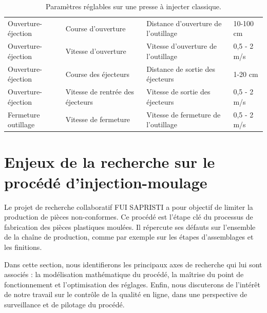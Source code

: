 \begin{table}[bhtp]
\begin{tabular}{|llll|}
		Ouverture-éjection     & Course d'ouverture               & Distance d'ouverture de l'outillage                                       & 10-100 cm                      \\
		Ouverture-éjection     & Vitesse d'ouverture              & Vitesse d'ouverture de l'outillage                                        & 0,5 - 2 m/s                    \\
		Ouverture-éjection     & Course des éjecteurs             & Distance de sortie des éjecteurs                                      & 1-20 cm                        \\
		Ouverture-éjection     & Vitesse de rentrée des éjecteurs & Vitesse de sortie des éjecteurs                                                               & 0,5 - 2 m/s                    \\
		Fermeture outillage      & Vitesse de fermeture             & Vitesse de fermeture de l'outillage                                                           & 0,5 - 2 m/s                   \\
		\hline
	\end{tabular}%
	\caption{Paramètres réglables sur une presse à injecter classique.}
	\label{tab:process_parameters}
\end{table}


\section{Enjeux de la recherche sur le procédé d'injection-moulage}  \label{sec:research_topics}
Le projet de recherche collaboratif FUI SAPRISTI a pour objectif de limiter la production de pièces non-conformes.
Ce procédé est l'étape clé du processus de fabrication des pièces plastiques moulées.
Il répercute ses défauts sur l'ensemble de la chaîne de production, comme par exemple sur les étapes d'assemblages et les finitions.

Dans cette section, nous identifierons les principaux axes de recherche qui lui sont associés : la modélisation mathématique du procédé, la maîtrise du point de fonctionnement et l'optimisation des réglages.
Enfin, nous discuterons de l'intérêt de notre travail sur le contrôle de la qualité en ligne, dans une perspective de surveillance et de pilotage du procédé.

